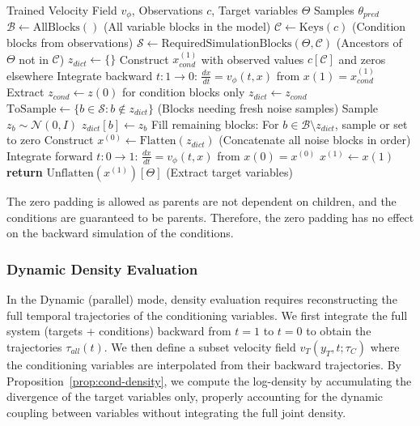 \begin{algorithm}[H]
\caption{Dynamic Conditional Sampling}
\label{alg:dynamic_sampling}
\begin{algorithmic}
\REQUIRE Trained Velocity Field $v_\phi$, Observations $c$, Target variables $\Theta$
\ENSURE Samples $\theta_{pred}$
\STATE $\mathcal{B} \gets \text{AllBlocks}()$ (All variable blocks in the model)
\STATE $\mathcal{C} \gets \text{Keys}(c)$ (Condition blocks from observations)
\STATE $\mathcal{S} \gets \text{RequiredSimulationBlocks}(\Theta, \mathcal{C})$ (Ancestors of $\Theta$ not in $\mathcal{C}$)
\STATE $z_{dict} \gets \{\}$
    \STATE Construct $x^{(1)}_{cond}$ with observed values $c[\mathcal{C}]$ and zeros elsewhere
    \STATE Integrate backward $t: 1 \to 0$: $\frac{dx}{dt} = v_\phi(t, x)$ from $x(1) = x^{(1)}_{cond}$
    \STATE Extract $z_{cond} \gets z(0)$ for condition blocks only
    \STATE $z_{dict} \gets z_{cond}$
\ENDIF
\STATE $\text{ToSample} \gets \{b \in \mathcal{S} : b \notin z_{dict}\}$ (Blocks needing fresh noise samples)
    \STATE Sample $z_b \sim \mathcal{N}(0, I)$
    \STATE $z_{dict}[b] \gets z_b$
\ENDFOR
\STATE Fill remaining blocks: For $b \in \mathcal{B} \setminus z_{dict}$, sample or set to zero
\STATE Construct $x^{(0)} \gets \text{Flatten}(z_{dict})$ (Concatenate all noise blocks in order)
\STATE Integrate forward $t: 0 \to 1$: $\frac{dx}{dt} = v_\phi(t, x)$ from $x(0) = x^{(0)}$
\STATE $x^{(1)} \gets x(1)$
\STATE \textbf{return} $\text{Unflatten}(x^{(1)})[\Theta]$ (Extract target variables)
\end{algorithmic}
\end{algorithm}

The zero padding is allowed as parents are not dependent on children, and the conditions are guaranteed to be parents. Therefore, the zero padding has no effect on the backward simulation of the conditions.

\subsubsection{Dynamic Density Evaluation}

In the Dynamic (parallel) mode, density evaluation requires reconstructing the full temporal trajectories of the conditioning variables. We first integrate the full system (targets + conditions) backward from $t=1$ to $t=0$ to obtain the trajectories $\tau_{all}(t)$. We then define a subset velocity field $v_T(y_T, t; \tau_C)$ where the conditioning variables are interpolated from their backward trajectories. By Proposition~\ref{prop:cond-density}, we compute the log-density by accumulating the divergence of the target variables only, properly accounting for the dynamic coupling between variables without integrating the full joint density.